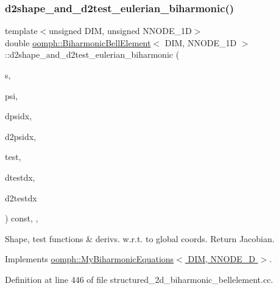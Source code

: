 \subsubsection{\texorpdfstring{d2shape\+\_\+and\+\_\+d2test\+\_\+eulerian\+\_\+biharmonic()}{d2shape\_and\_d2test\_eulerian\_biharmonic()}}
{\footnotesize\ttfamily template$<$unsigned D\+IM, unsigned N\+N\+O\+D\+E\+\_\+1D$>$ \\
double \hyperlink{classoomph_1_1BiharmonicBellElement}{oomph\+::\+Biharmonic\+Bell\+Element}$<$ D\+IM, N\+N\+O\+D\+E\+\_\+1D $>$\+::d2shape\+\_\+and\+\_\+d2test\+\_\+eulerian\+\_\+biharmonic (\begin{DoxyParamCaption}\item[{const Vector$<$ double $>$ \&}]{s,  }\item[{Shape \&}]{psi,  }\item[{D\+Shape \&}]{dpsidx,  }\item[{D\+Shape \&}]{d2psidx,  }\item[{Shape \&}]{test,  }\item[{D\+Shape \&}]{dtestdx,  }\item[{D\+Shape \&}]{d2testdx }\end{DoxyParamCaption}) const\hspace{0.3cm}{\ttfamily [inline]}, {\ttfamily [protected]}, {\ttfamily [virtual]}}



Shape, test functions \& derivs. w.\+r.\+t. to global coords. Return Jacobian. 



Implements \hyperlink{classoomph_1_1MyBiharmonicEquations_a4597b3938b6f1244d6e8e0f58250c14a}{oomph\+::\+My\+Biharmonic\+Equations$<$ D\+I\+M, N\+N\+O\+D\+E\+\_\+D $>$}.



Definition at line 446 of file structured\+\_\+2d\+\_\+biharmonic\+\_\+bellelement.\+cc.

\mbox{\label{classoomph_1_1BiharmonicBellElement_ab15a039def500f435638bed6f02edbcb}} 
